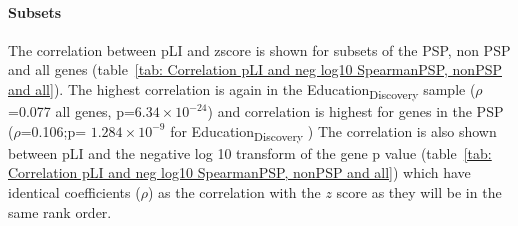 \paragraph{Subsets}


The correlation between pLI and zscore is shown for subsets of the PSP, non PSP and all genes (table~\ref{tab: Correlation pLI and neg log10 SpearmanPSP, nonPSP and all}). The highest correlation is again in the Education\textsubscript{Discovery} sample ($\rho$=0.077 all genes, p=$6.34 \times 10^{-24}$) and correlation is highest for genes in the PSP ($\rho$=0.106;p= $1.284 \times 10^{-9}$ for Education\textsubscript{Discovery} ) 
The correlation is also shown between pLI and the negative log 10 transform of the gene p value (table~\ref{tab: Correlation pLI and neg log10 SpearmanPSP, nonPSP and all}) which have identical coefficients ($\rho$) as the correlation with the $z$ score as they will be in the same rank order. 









